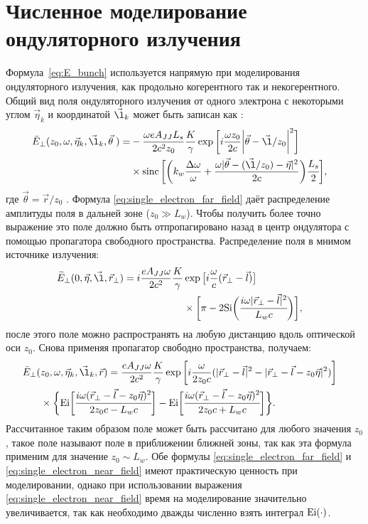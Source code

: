 \section{Численное моделирование ондуляторного излучения}
Формула~\ref{eq:E_bunch} используется напрямую при моделирования ондуляторного излучения, как продольно когерентного так и некогерентного. Общий вид поля ондуляторного излучения от одного электрона с некоторыми углом $\vec{\eta}_k$ и координатой $\vec{\l}_k$ может быть записан как \cite{geloni_fourier_2007} : 
\begin{align}
	\bar{E}_{\bot}(z_0, \omega, \vec{\eta}_k, \vec{\l}_k, \vec{\theta} \;) =
&	-\frac{\omega e A_{JJ} L_s}{2c^2z_0}\frac{K}{\gamma}\exp{\bigg[i \frac{\omega z_0}{2c} \bigg|\vec{\theta} - \vec{\l}/z_0\bigg|^2 \bigg]} \cr & \times \sinc \bigg[\bigg(k_w \frac{\Delta \omega}{\omega} + \frac{\omega |\vec{\theta} - (\vec{\l}/z_0) - \vec{\eta}|^2}{2c}\bigg)\cfrac{L_s}{2}\bigg],
	\label{eq:single_electron_far_field}
\end{align}
где $\vec{\theta} = \vec{r}/z_0$ . Формула \ref{eq:single_electron_far_field} даёт распределение амплитуды поля в дальней зоне ($z_0 \gg L_w$). Чтобы получить более точно выражение это поле должно быть отпропагировано назад в центр ондулятора с помощью пропагатора свободного пространства. Распределение поля в мнимом источнике излучения: 
\begin{align}
	\widetilde{E}_{\bot}(0, \vec{\eta}, \vec{\l}, \vec{r}_{\bot}) =
	i \frac{e A_{JJ} \omega}{2 c^2}\frac{K}{\gamma} &\exp{\big[i \frac{\omega}{c} (\vec{r}_{\bot} - \vec{l})\big]}\cr & \times \bigg [\pi - 2\text{Si} \bigg( \cfrac{i \omega |\vec{r}_{\bot} - \vec{l}|^2}{L_w c}\bigg)\bigg], 
	\label{eq:single_electron_near_field_z=0}
\end{align}
после этого поле можно распространять на любую дистанцию вдоль оптической оси $z_0$. Снова применяя пропагатор свободно пространства, получаем:
\begin{align}
	\bar{E}_{\bot}(&z_0, \omega, \vec{\eta}_k, \vec{\l}_k, \vec{r}) =
		\frac{e A_{JJ} \omega}{2 c^2}\frac{K}{\gamma} \exp{\bigg[i \frac{\omega}{2 z_0 c} (|\vec{r}_{\bot} - \vec{l}|^2 - |\vec{r}_{\bot} - \vec{l} - z_0 \vec{\eta}|^2) \bigg]} \cr & \times	\bigg \{ \text{Ei} \bigg[ \cfrac{i \omega (\vec{r}_{\bot} - \vec{l} - z_0 \vec{\eta})^2}{2z_0c - L_w c}\bigg] - \text{Ei} \bigg[ \cfrac{i \omega (\vec{r}_{\bot} - \vec{l} - z_0 \vec{\eta})^2}{2z_0c + L_w c} \bigg] \bigg\}.
	\label{eq:single_electron_near_field}
\end{align}
Рассчитанное таким образом поле может быть рассчитано для любого значения $z_0$, такое поле называют поле в приближении ближней зоны, так как эта формула применим для значение $z_0 \sim L_w$. Обе формулы \ref{eq:single_electron_far_field} и \ref{eq:single_electron_near_field} имеют практическую ценность при моделировании, однако при использовании выражения \ref{eq:single_electron_near_field} время на моделирование значительно увеличивается, так как необходимо дважды численно взять интеграл $\textup{Ei}(\cdot)$.
 
